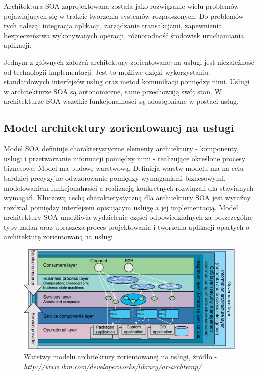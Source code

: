 	Architektura SOA zaprojektowana została jako rozwiązanie wielu problemów pojawiających się w trakcie tworzenia systemów rozproszonych. Do problemów tych należą: integracja aplikacji, zarządzanie transakcjami, zapewnienia bezpieczeństwa wykonywanych operacji, różnorodność środowisk uruchamiania aplikacji\cite{Papazoglou07}.

	Jednym z głównych założeń architektury zorientowanej na usługi jest niezależność od technologii implementacji. Jest to możliwe dzięki wykorzystaniu standardowych interfejsów usług oraz metod komunikacji pomiędzy nimi. Usługi w architekturze SOA są autonomiczne, same przechowują swój stan. W architekturze SOA wszelkie funkcjonalności są udostępniane w postaci usług.
	
	\subsection{Model architektury zorientowanej na usługi}
	
		Model SOA definiuje charakterystyczne elementy architektury - komponenty, usługi i przetwarzanie informacji pomiędzy nimi - realizujące określone procesy biznesowe. Model ma budowę warstwową. Definicja warstw modelu ma na celu bardziej precyzyjne odwzorowanie pomiędzy wymaganiami biznesowymi, modelowaniem funkcjonalności a realizacją konkretnych rozwiązań dla stawianych wymagań. Kluczową cechą charakterystyczną dla architektury SOA jest wyraźny rozdział pomiędzy interfejsem opisującym usługę a jej implementacją. Model architektury SOA umożliwia wydzielenie części odpowiedzialnych za poszczególne typy zadań oraz upraszcza proces projektowania i tworzenia aplikacji opartych o architekturę zorientowaną na usługi\cite{Arsanjani07}. 

		\begin{figure}[h]
			\centering
			\includegraphics[width=15cm]{img/s3.jpg}
			\caption{Warstwy modelu architektury zorientowanej na usługi, źródło - \textit{http://www.ibm.com/developerworks/library/ar-archtemp/}}
			\label{soaModel}
		\end{figure}
		
